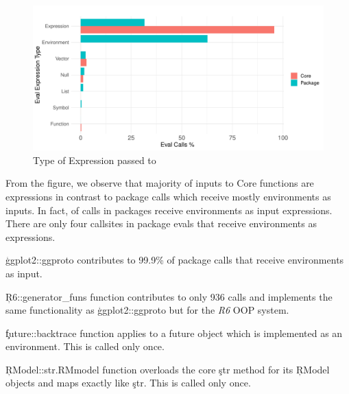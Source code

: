 \documentclass[conference]{IEEEtran}
\begin{document}
\begin{figure}[!h]
  \centering
  \includegraphics[width=\columnwidth]{eval-expression-kind}
  \caption{Type of Expression passed to \eval} \label{fig:eval-expression-kind}
\end{figure}

From the figure, we observe that majority of inputs to Core \eval functions are
expressions in contrast to package \eval calls which receive mostly environments
as inputs. In fact, \PackageEnvironmentInputEvalCallPerc of \eval calls in
packages receive environments as input expressions. There are only four
callsites in package evals that receive environments as expressions.
\begin{compactitem}[$-$]
\item \c{ggplot2::ggproto} contributes to 99.9\% of package \eval calls that
receive environments as input.
\item \c{R6::generator_funs} function contributes to only 936 \eval calls and
implements the same functionality as \c{ggplot2::ggproto} but for the \emph{R6}
OOP system.
\item \c{future::backtrace} function applies \eval to a future object which is
implemented as an environment. This is called only once.
\item \c{RModel::str.RMmodel} function overloads the core \c{str} method for its
\c{RModel} objects and maps \eval exactly like \c{str}. This is called only
once.
\end{compactitem}
\end{document}
